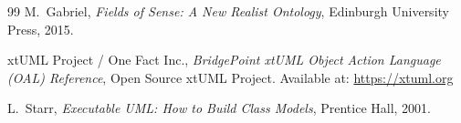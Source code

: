 \documentclass[11pt,a4paper]{ltjsarticle}
\theoremstyle{definition}
\theoremstyle{plain}
\theoremstyle{remark}
\begin{document}
\begin{thebibliography}{99}
M.~Gabriel, \emph{Fields of Sense: A New Realist Ontology}, Edinburgh University Press, 2015.

xtUML Project / One Fact Inc., \emph{BridgePoint xtUML Object Action Language (OAL) Reference}, Open Source xtUML Project. Available at: \url{https://xtuml.org}

L.~Starr, \emph{Executable UML: How to Build Class Models}, Prentice Hall, 2001.

\end{thebibliography}
\end{document}
